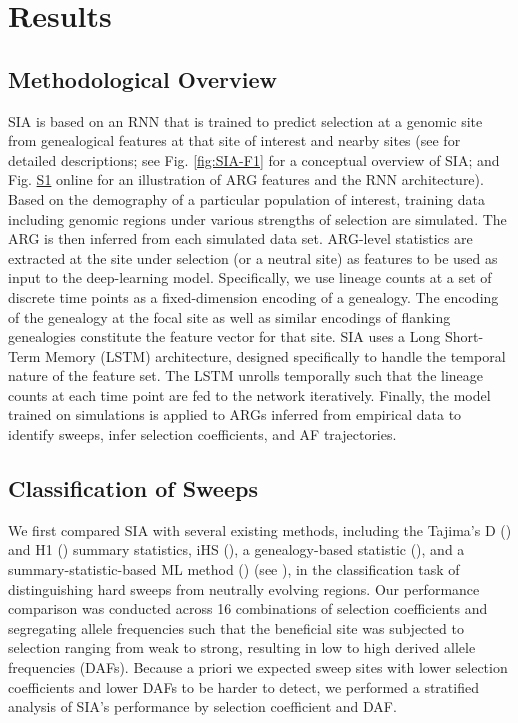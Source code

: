 \section{Results}
\subsection{Methodological Overview}
SIA is based on an RNN that is trained to predict selection at a genomic site from genealogical features at that site of interest and nearby sites (see  for detailed descriptions; see Fig. \ref{fig:SIA-F1} for a conceptual overview of SIA; and Fig. \href{https://academic.oup.com/mbe/article/39/1/msab332/6433161#supplementary-data}{S1} online for an illustration of ARG features and the RNN architecture). Based on the demography of a particular population of interest, training data including genomic regions under various strengths of selection are simulated. The ARG is then inferred from each simulated data set. ARG-level statistics are extracted at the site under selection (or a neutral site) as features to be used as input to the deep-learning model. Specifically, we use lineage counts at a set of discrete time points as a fixed-dimension encoding of a genealogy. The encoding of the genealogy at the focal site as well as similar encodings of flanking genealogies constitute the feature vector for that site. SIA uses a Long Short-Term Memory (LSTM) architecture, designed specifically to handle the temporal nature of the feature set. The LSTM unrolls temporally such that the lineage counts at each time point are fed to the network iteratively. Finally, the model trained on simulations is applied to ARGs inferred from empirical data to identify sweeps, infer selection coefficients, and AF trajectories.

\subsection{Classification of Sweeps}
We first compared SIA with several existing methods, including the Tajima’s D (\cite{tajima_statistical_1989}) and H1 (\cite{garud_recent_2015}) summary statistics, iHS (\cite{voight_map_2006}), a genealogy-based statistic (\cite{speidel_method_2019}), and a summary-statistic-based ML method (\cite{schrider_shic_2016,kern_diploshic_2018}) (see ), in the classification task of distinguishing hard sweeps from neutrally evolving regions. Our performance comparison was conducted across 16 combinations of selection coefficients and segregating allele frequencies such that the beneficial site was subjected to selection ranging from weak to strong, resulting in low to high derived allele frequencies (DAFs). Because a priori we expected sweep sites with lower selection coefficients and lower DAFs to be harder to detect, we performed a stratified analysis of SIA’s performance by selection coefficient and DAF.


